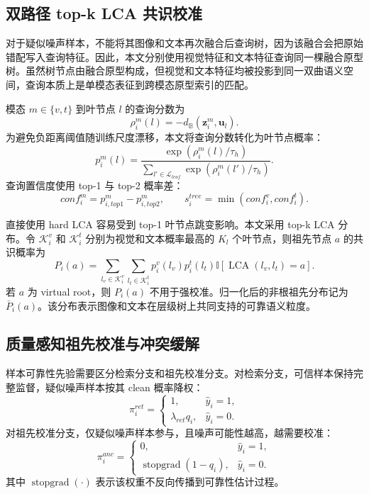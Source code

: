 \subsection{双路径 top-k LCA 共识校准}

对于疑似噪声样本，不能将其图像和文本再次融合后查询树，因为该融合会把原始错配写入查询特征。因此，本文分别使用视觉特征和文本特征查询同一棵融合原型树。虽然树节点由融合原型构成，但视觉和文本特征均被投影到同一双曲语义空间，查询本质上是单模态表征到跨模态原型索引的匹配。

模态 $m\in\{v,t\}$ 到叶节点 $l$ 的查询分数为
\begin{equation}
    \rho_i^m(l)=-d_{\mathbb{B}}(\boldsymbol{z}_i^m,\boldsymbol{u}_l).
\end{equation}
为避免负距离阈值随训练尺度漂移，本文将查询分数转化为叶节点概率：
\begin{equation}
    p_i^m(l)=
    \frac{
    \exp(\rho_i^m(l)/\tau_h)
    }
    {
    \sum_{l'\in\mathcal{L}_{leaf}}
    \exp(\rho_i^m(l')/\tau_h)
    }.
\end{equation}
查询置信度使用 top-1 与 top-2 概率差：
\begin{equation}
    conf_i^m=p_{i,top1}^m-p_{i,top2}^m,\qquad
    s_i^{tree}=\min(conf_i^v,conf_i^t).
\end{equation}

直接使用 hard LCA 容易受到 top-1 叶节点跳变影响。本文采用 top-k LCA 分布。令 $\mathcal{K}_i^v$ 和 $\mathcal{K}_i^t$ 分别为视觉和文本概率最高的 $K_l$ 个叶节点，则祖先节点 $a$ 的共识概率为
\begin{equation}
    P_i(a)
    =
    \sum_{l_v\in\mathcal{K}_i^v}
    \sum_{l_t\in\mathcal{K}_i^t}
    p_i^v(l_v)p_i^t(l_t)
    \mathbb{I}[\operatorname{LCA}(l_v,l_t)=a].
\end{equation}
若 $a$ 为 virtual root，则 $P_i(a)$ 不用于强校准。归一化后的非根祖先分布记为 $\bar{P}_i(a)$。该分布表示图像和文本在层级树上共同支持的可靠语义粒度。

\subsection{质量感知祖先校准与冲突缓解}

样本可靠性先验需要区分检索分支和祖先校准分支。对检索分支，可信样本保持完整监督，疑似噪声样本按其 clean 概率降权：
\begin{equation}
    \pi_i^{ret}
    =
    \begin{cases}
    1, & \hat{y}_i=1,\\
    \lambda_{ret}q_i, & \hat{y}_i=0.
    \end{cases}
\end{equation}
对祖先校准分支，仅疑似噪声样本参与，且噪声可能性越高，越需要校准：
\begin{equation}
    \pi_i^{anc}
    =
    \begin{cases}
    0, & \hat{y}_i=1,\\
    \operatorname{stopgrad}(1-q_i), & \hat{y}_i=0.
    \end{cases}
\end{equation}
其中 $\operatorname{stopgrad}(\cdot)$ 表示该权重不反向传播到可靠性估计过程。


